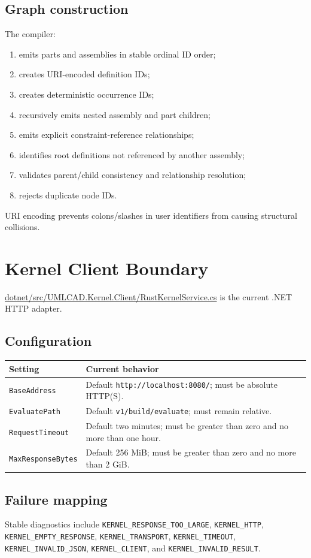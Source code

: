 \documentclass[11pt,a4paper]{report}
\newcommand{\pathref}[1]{\url{#1}}
\begin{document}
\section{Graph construction}
The compiler:
\begin{enumerate}
\item emits parts and assemblies in stable ordinal ID order;
\item creates URI-encoded definition IDs;
\item creates deterministic occurrence IDs;
\item recursively emits nested assembly and part children;
\item emits explicit constraint-reference relationships;
\item identifies root definitions not referenced by another assembly;
\item validates parent/child consistency and relationship resolution;
\item rejects duplicate node IDs.
\end{enumerate}
URI encoding prevents colons/slashes in user identifiers from causing structural collisions.

\chapter{Kernel Client Boundary}

\pathref{dotnet/src/UMLCAD.Kernel.Client/RustKernelService.cs} is the current .NET HTTP adapter.

\section{Configuration}
\begin{tabularx}{\textwidth}{@{}p{}X@{}}
\toprule
Setting & Current behavior \\
\midrule
\texttt{BaseAddress} & Default \texttt{http://localhost:8080/}; must be absolute HTTP(S). \\
\texttt{EvaluatePath} & Default \texttt{v1/build/evaluate}; must remain relative. \\
\texttt{RequestTimeout} & Default two minutes; must be greater than zero and no more than one hour. \\
\texttt{MaxResponseBytes} & Default 256 MiB; must be greater than zero and no more than 2 GiB. \\
\bottomrule
\end{tabularx}

\section{Failure mapping}
Stable diagnostics include \texttt{KERNEL\_RESPONSE\_TOO\_LARGE}, \texttt{KERNEL\_HTTP}, \texttt{KERNEL\_EMPTY\_RESPONSE}, \texttt{KERNEL\_TRANSPORT}, \texttt{KERNEL\_TIMEOUT}, \texttt{KERNEL\_INVALID\_JSON}, \texttt{KERNEL\_CLIENT}, and \texttt{KERNEL\_INVALID\_RESULT}.
\end{document}
